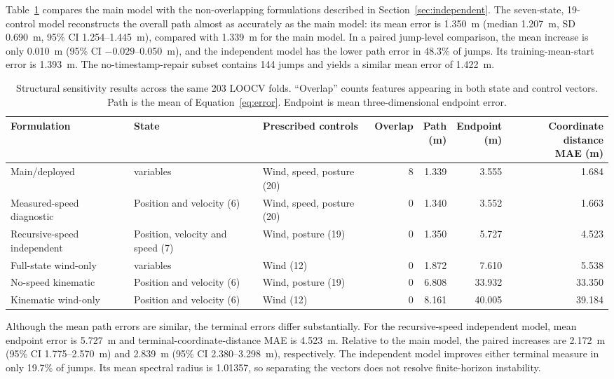 \documentclass[11pt,twoside,a4paper]{article}
\begin{document}
Table~\ref{tab:independent} compares the main model with the non-overlapping formulations described in Section~\ref{sec:independent}. The seven-state, 19-control model reconstructs the overall path almost as accurately as the main model: its mean error is 1.350~m (median 1.207~m, SD 0.690~m, 95\% CI 1.254--1.445~m), compared with 1.339~m for the main model. In a paired jump-level comparison, the mean increase is only 0.010~m (95\% CI $-0.029$--0.050~m), and the independent model has the lower path error in 48.3\% of jumps. Its training-mean-start error is 1.393~m. The no-timestamp-repair subset contains 144 jumps and yields a similar mean error of 1.422~m.

\begin{table}[t]
\centering
\small
\begin{tabularx}{\textwidth}{@{}>{\raggedright\arraybackslash}X>{\raggedright\arraybackslash}X>{\raggedright\arraybackslash}Xrrrr@{}}
\toprule
Formulation & State & Prescribed controls & Overlap & \shortstack{Path\\(m)} & \shortstack{Endpoint\\(m)} & \shortstack{Coordinate distance\\MAE (m)} \\
\midrule
Main/deployed & 14 variables & Wind, speed, posture (20) & 8 & 1.339 & 3.555 & 1.684 \\
Measured-speed diagnostic & Position and velocity (6) & Wind, speed, posture (20) & 0 & 1.340 & 3.552 & 1.663 \\
Recursive-speed independent & Position, velocity and speed (7) & Wind, posture (19) & 0 & 1.350 & 5.727 & 4.523 \\
Full-state wind-only & 14 variables & Wind (12) & 0 & 1.872 & 7.610 & 5.538 \\
No-speed kinematic & Position and velocity (6) & Wind, posture (19) & 0 & 6.808 & 33.932 & 33.350 \\
Kinematic wind-only & Position and velocity (6) & Wind (12) & 0 & 8.161 & 40.005 & 39.184 \\
\bottomrule
\end{tabularx}
\caption{Structural sensitivity results across the same 203 LOOCV folds. ``Overlap'' counts features appearing in both state and control vectors. Path is the mean of Equation~\eqref{eq:error}. Endpoint is mean three-dimensional endpoint error.}
\label{tab:independent}
\end{table}

Although the mean path errors are similar, the terminal errors differ substantially. For the recursive-speed independent model, mean endpoint error is 5.727~m and terminal-coordinate-distance MAE is 4.523~m. Relative to the main model, the paired increases are 2.172~m (95\% CI 1.775--2.570~m) and 2.839~m (95\% CI 2.380--3.298~m), respectively. The independent model improves either terminal measure in only 19.7\% of jumps. Its mean spectral radius is 1.01357, so separating the vectors does not resolve finite-horizon instability.
\end{document}
